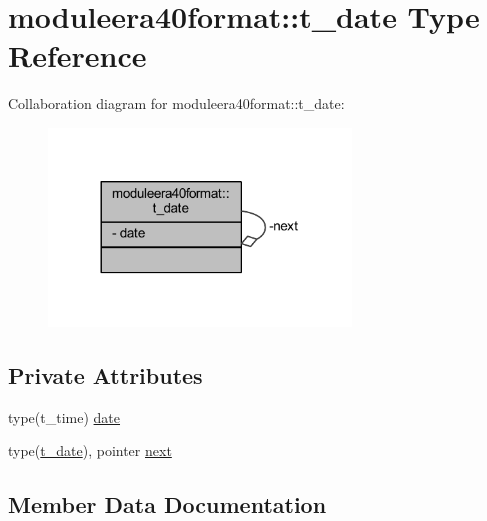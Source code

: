 \hypertarget{structmoduleera40format_1_1t__date}{}\section{moduleera40format\+:\+:t\+\_\+date Type Reference}
\label{structmoduleera40format_1_1t__date}


Collaboration diagram for moduleera40format\+:\+:t\+\_\+date\+:\nopagebreak
\begin{figure}[H]
\begin{center}
\leavevmode
\includegraphics[width=228pt]{structmoduleera40format_1_1t__date__coll__graph}
\end{center}
\end{figure}
\subsection*{Private Attributes}
\begin{DoxyCompactItemize}
\item 
type(t\+\_\+time) \mbox{\hyperlink{structmoduleera40format_1_1t__date_a47e29b7abc64b74455875d54ba81e49e}{date}}
\item 
type(\mbox{\hyperlink{structmoduleera40format_1_1t__date}{t\+\_\+date}}), pointer \mbox{\hyperlink{structmoduleera40format_1_1t__date_a288e01c1e9bce096bd97acc8cdb495d7}{next}}
\end{DoxyCompactItemize}


\subsection{Member Data Documentation}
\mbox{\label{structmoduleera40format_1_1t__date_a47e29b7abc64b74455875d54ba81e49e}} 
